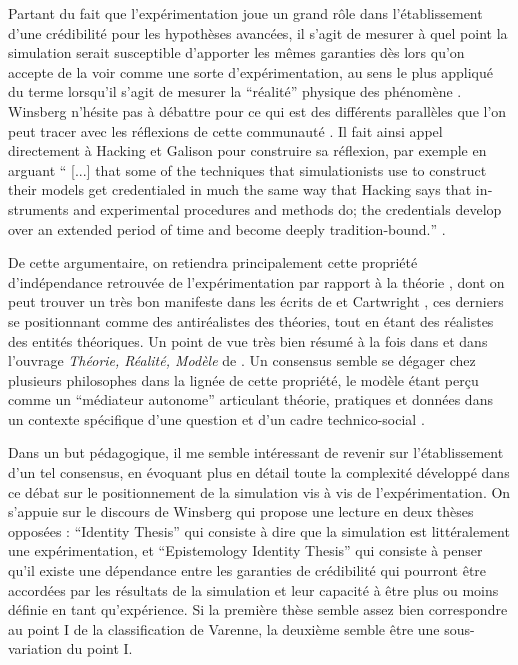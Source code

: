 Partant du fait que l'expérimentation joue un grand rôle dans l'établissement d'une crédibilité pour les hypothèses avancées, il s'agit de mesurer à quel point la simulation serait susceptible d'apporter les mêmes garanties dès lors qu'on accepte de la voir comme une sorte d'expérimentation, au sens le plus appliqué du terme lorsqu'il s'agit de mesurer la \enquote{réalité} physique des phénomène . Winsberg n'hésite pas à débattre pour ce qui est des différents parallèles que l'on peut tracer avec les réflexions de cette communauté . Il fait ainsi appel directement à Hacking et Galison pour construire sa réflexion, par exemple en arguant \foreignquote{english}{ [...] that some of the techniques that simulationists use to construct their models get credentialed in much the same way that Hacking says that instruments and experimental procedures and methods do; the credentials develop over an extended period of time and become deeply tradition-bound.} \autocites{Winsberg2003, Winsberg2013} . 

De cette argumentaire, on retiendra principalement cette propriété d'indépendance retrouvée de l'expérimentation par rapport à la théorie , dont on peut trouver un très bon manifeste dans les écrits de \textcite{Hacking1989} et Cartwright , ces derniers se positionnant comme des antiréalistes des théories, tout en étant des réalistes des entités théoriques. Un point de vue très bien résumé à la fois dans \textcite{Hacking1989} et dans l'ouvrage \textit{Théorie, Réalité, Modèle} de \textcite[226-231]{Varenne2012}. Un consensus semble se dégager chez plusieurs philosophes \autocites{Morgan2009, Varenne2001, Varenne2013b} dans la lignée de cette propriété, le modèle étant perçu comme un \enquote{médiateur autonome} articulant théorie, pratiques et données dans un contexte spécifique d'une question et d'un cadre technico-social \autocite[2]{Phan2010} .

Dans un but pédagogique, il me semble intéressant de revenir sur l'établissement d'un tel consensus, en évoquant plus en détail toute la complexité développé dans ce débat sur le positionnement de la simulation vis à vis de l'expérimentation. On s'appuie sur le discours de Winsberg qui propose une lecture en deux thèses opposées : \foreignquote{english}{Identity Thesis} qui consiste à dire que la simulation est littéralement une expérimentation, et \foreignquote{english}{Epistemology Identity Thesis} qui consiste à penser qu'il existe une dépendance entre les garanties de crédibilité qui pourront être accordées par les résultats de la simulation et leur capacité à être plus ou moins définie en tant qu'expérience. Si la première thèse semble assez bien correspondre au point I de la classification de Varenne, la deuxième semble être une sous-variation du point I.

